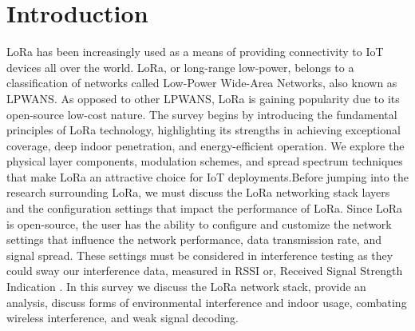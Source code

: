 \documentclass[sigsmall]{acmart}
\begin{document}
\section*{Introduction}
LoRa has been increasingly used as a means of providing connectivity to IoT devices all over the world. LoRa, or long-range low-power, belongs to a classification of networks called Low-Power Wide-Area Networks, also known as LPWANS. As opposed to other LPWANS, LoRa is gaining popularity due to its open-source low-cost nature. The survey begins by introducing the fundamental principles of LoRa technology, highlighting its strengths in achieving exceptional coverage, deep indoor penetration, and energy-efficient operation. We explore the physical layer components, modulation schemes, and spread spectrum techniques that make LoRa an attractive choice for IoT deployments.Before jumping into the research surrounding LoRa, we must discuss the LoRa networking stack layers and the configuration settings that impact the performance of LoRa. Since LoRa is open-source, the user has the ability to configure and customize the network settings that influence the network performance, data transmission rate, and signal spread. These settings must be considered in interference testing as they could sway our interference data, measured in RSSI or, Received Signal Strength Indication \cite{loraLoRax2014}. In this survey we discuss the LoRa network stack, provide an analysis, discuss forms of environmental interference and indoor usage, combating wireless interference, and weak signal decoding.
\end{document}
